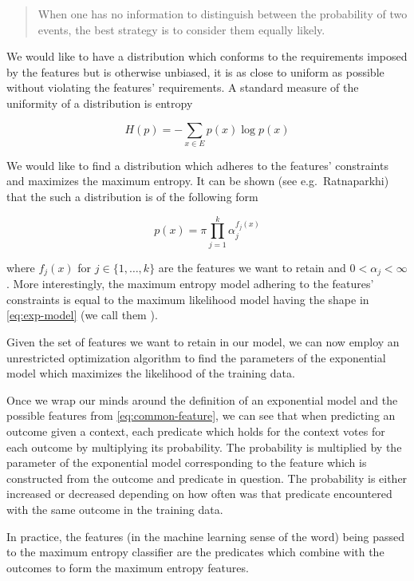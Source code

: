 \begin{quote}
When one has no information to distinguish between the probability of two
events, the best strategy is to consider them equally likely.
\end{quote}

We would like to have a distribution which conforms to the requirements imposed
by the features but is otherwise unbiased, it is as close to uniform as
possible without violating the features' requirements. A standard measure of
the uniformity of a distribution is entropy

\[
H(p) = -\sum_{x \in E} p(x) \log p(x)
\]

We would like to find a distribution which adheres to the features' constraints
and maximizes the maximum entropy. It can be shown (see e.g.\ Ratnaparkhi) that
the such a distribution is of the following form

\begin{equation}
\label{eq:exp-model}
p(x) = \pi \prod_{j=1}^k \alpha_j^{f_j(x)}
\end{equation}

where $f_j(x)$ for $j \in \{1,\dotsc,k\}$ are the features we want to retain
and $0 < \alpha_j < \infty$. More interestingly, the maximum entropy model
adhering to the features' constraints is equal to the maximum likelihood model
having the shape in \ref{eq:exp-model} (we call them ). 

Given the set of features we want to retain in our model, we can now employ an
unrestricted optimization algorithm to find the parameters of the exponential
model which maximizes the likelihood of the training data.

Once we wrap our minds around the definition of an exponential model and the
possible features from \ref{eq:common-feature}, we can see that when predicting
an outcome given a context, each predicate which holds for the context votes
for each outcome by multiplying its probability. The probability is multiplied
by the parameter of the exponential model corresponding to the feature which
is constructed from the outcome and predicate in question. The probability is
either increased or decreased depending on how often was that predicate
encountered with the same outcome in the training data.

In practice, the features (in the machine learning sense of the word) being
passed to the maximum entropy classifier are the predicates which combine with
the outcomes to form the maximum entropy features.

